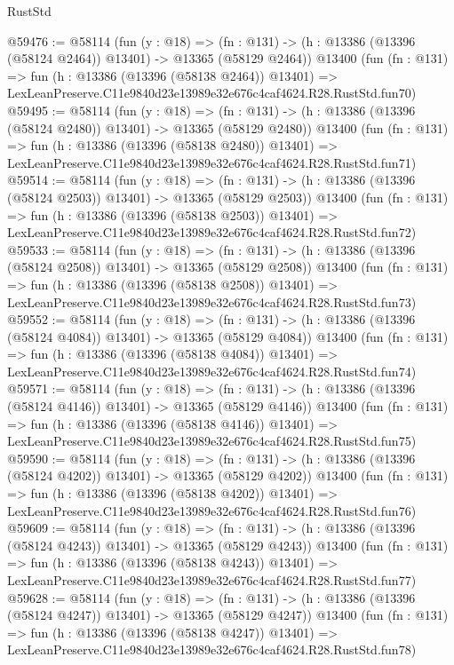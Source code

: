 \begin{lexlean}{RustStd}
\begin{coremodule}
@59476 := @58114
    (fun (y : @18) =>
    (fn : @131) -> (h : @13386 (@13396 (@58124 @2464)) @13401) -> @13365 (@58129 @2464))
    @13400
    (fun (fn : @131) =>
    fun (h : @13386 (@13396 (@58138 @2464)) @13401) =>
    LexLeanPreserve.C11e9840d23e13989e32e676c4caf4624.R28.RustStd.fun70)
@59495 := @58114
    (fun (y : @18) =>
    (fn : @131) -> (h : @13386 (@13396 (@58124 @2480)) @13401) -> @13365 (@58129 @2480))
    @13400
    (fun (fn : @131) =>
    fun (h : @13386 (@13396 (@58138 @2480)) @13401) =>
    LexLeanPreserve.C11e9840d23e13989e32e676c4caf4624.R28.RustStd.fun71)
@59514 := @58114
    (fun (y : @18) =>
    (fn : @131) -> (h : @13386 (@13396 (@58124 @2503)) @13401) -> @13365 (@58129 @2503))
    @13400
    (fun (fn : @131) =>
    fun (h : @13386 (@13396 (@58138 @2503)) @13401) =>
    LexLeanPreserve.C11e9840d23e13989e32e676c4caf4624.R28.RustStd.fun72)
@59533 := @58114
    (fun (y : @18) =>
    (fn : @131) -> (h : @13386 (@13396 (@58124 @2508)) @13401) -> @13365 (@58129 @2508))
    @13400
    (fun (fn : @131) =>
    fun (h : @13386 (@13396 (@58138 @2508)) @13401) =>
    LexLeanPreserve.C11e9840d23e13989e32e676c4caf4624.R28.RustStd.fun73)
@59552 := @58114
    (fun (y : @18) =>
    (fn : @131) -> (h : @13386 (@13396 (@58124 @4084)) @13401) -> @13365 (@58129 @4084))
    @13400
    (fun (fn : @131) =>
    fun (h : @13386 (@13396 (@58138 @4084)) @13401) =>
    LexLeanPreserve.C11e9840d23e13989e32e676c4caf4624.R28.RustStd.fun74)
@59571 := @58114
    (fun (y : @18) =>
    (fn : @131) -> (h : @13386 (@13396 (@58124 @4146)) @13401) -> @13365 (@58129 @4146))
    @13400
    (fun (fn : @131) =>
    fun (h : @13386 (@13396 (@58138 @4146)) @13401) =>
    LexLeanPreserve.C11e9840d23e13989e32e676c4caf4624.R28.RustStd.fun75)
@59590 := @58114
    (fun (y : @18) =>
    (fn : @131) -> (h : @13386 (@13396 (@58124 @4202)) @13401) -> @13365 (@58129 @4202))
    @13400
    (fun (fn : @131) =>
    fun (h : @13386 (@13396 (@58138 @4202)) @13401) =>
    LexLeanPreserve.C11e9840d23e13989e32e676c4caf4624.R28.RustStd.fun76)
@59609 := @58114
    (fun (y : @18) =>
    (fn : @131) -> (h : @13386 (@13396 (@58124 @4243)) @13401) -> @13365 (@58129 @4243))
    @13400
    (fun (fn : @131) =>
    fun (h : @13386 (@13396 (@58138 @4243)) @13401) =>
    LexLeanPreserve.C11e9840d23e13989e32e676c4caf4624.R28.RustStd.fun77)
@59628 := @58114
    (fun (y : @18) =>
    (fn : @131) -> (h : @13386 (@13396 (@58124 @4247)) @13401) -> @13365 (@58129 @4247))
    @13400
    (fun (fn : @131) =>
    fun (h : @13386 (@13396 (@58138 @4247)) @13401) =>
    LexLeanPreserve.C11e9840d23e13989e32e676c4caf4624.R28.RustStd.fun78)

\end{coremodule}
\end{lexlean}
